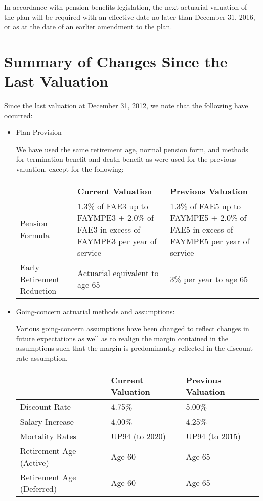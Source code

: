 \documentclass{report}
\begin{document}
\vspace{3mm}
In accordance with pension benefits legislation, the next actuarial valuation of the plan will be required with an effective date no later than December 31, 2016, or as at the date of an earlier amendment to the plan.

\section{Summary of Changes Since the Last Valuation}

Since the last valuation at December 31, 2012, we note that the following have occurred:

\begin{itemize}
\item Plan Provision

We have used the same retirement age, normal pension form, and methods for termination benefit and death benefit as were used for the previous valuation, except for the following:

\vspace{3mm}
\bgroup
\normalsize
\def\arraystretch{1.5}
\begin{tabular}{p{4.5cm} p{5cm}  p{5cm}}
\hline
& Current Valuation & Previous Valuation \\ \hline
Pension Formula & 1.3\% of FAE3 up to FAYMPE3 + 2.0\% of FAE3 in excess of FAYMPE3 per year of service & 1.3\% of FAE5 up to FAYMPE5 + 2.0\% of FAE5 in excess of FAYMPE5 per year of service \\ \hline
Early Retirement Reduction & Actuarial equivalent to age 65 & 3\% per year to age 65 \\ \hline
\end{tabular}
\egroup

\vspace{3mm}
\item Going-concern actuarial methods and assumptions:

Various going-concern assumptions have been changed to reflect changes in future expectations as well as to realign the margin contained in the assumptions such that the margin is predominantly reflected in the discount rate assumption.

\vspace{3mm}
\bgroup
\normalsize
\def\arraystretch{1.5}
\begin{tabular}{p{4.5cm} p{5cm}  p{5cm}}
\hline
& Current Valuation & Previous Valuation \\ \hline
Discount Rate & 4.75\% & 5.00\% \\ \hline
Salary Increase & 4.00\% & 4.25\% \\ \hline
Mortality Rates & UP94 (to 2020) & UP94 (to 2015) \\ \hline
Retirement Age (Active) & Age 60 & Age 65 \\ \hline
Retirement Age (Deferred) & Age 60 & Age 65 \\ \hline
\end{tabular}
\egroup


\end{itemize}
\end{document}

